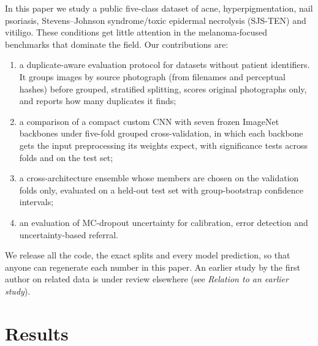 \documentclass[11pt]{article}
\begin{document}
In this paper we study a public five-class dataset of acne, hyperpigmentation, nail psoriasis, Stevens--Johnson syndrome/toxic epidermal necrolysis (SJS-TEN) and vitiligo\cite{khushbu2024dataset}. These conditions get little attention in the melanoma-focused benchmarks that dominate the field. Our contributions are:
\begin{enumerate}
  \item a duplicate-aware evaluation protocol for datasets without patient identifiers. It groups images by source photograph (from filenames and perceptual hashes) before grouped, stratified splitting, scores original photographs only, and reports how many duplicates it finds;
  \item a comparison of a compact custom CNN with seven frozen ImageNet backbones under five-fold grouped cross-validation, in which each backbone gets the input preprocessing its weights expect, with significance tests across folds and on the test set;
  \item a cross-architecture ensemble whose members are chosen on the validation folds only, evaluated on a held-out test set with group-bootstrap confidence intervals;
  \item an evaluation of MC-dropout uncertainty for calibration, error detection and uncertainty-based referral.
\end{enumerate}
We release all the code, the exact splits and every model prediction, so that anyone can regenerate each number in this paper. An earlier study by the first author on related data is under review elsewhere (see \emph{Relation to an earlier study}).

\section*{Results}
\end{document}
